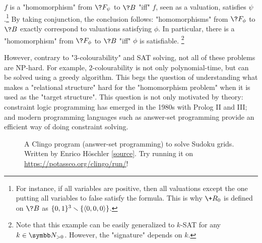 \begin{example}
	$f$ is a "homomorphism" from $\?F_\psi$ to $\?B$ "iff"
	$f$, seen as a valuation, satisfies $\psi$.\footnote{For instance,
	if all variables are positive, then all valuations except the one putting
	all variables to false satisfy the formula. This is why $\+R_0$ is defined
	on $\?B$ as $\{0,1\}^3\smallsetminus \{\langle0,0,0\rangle\}$.}
	By taking conjunction, the conclusion follows: "homomorphisms" from
	$\?F_\phi$ to $\?B$ exactly correspond to valuations satisfying $\phi$.
	In particular, there is a "homomorphism" from $\?F_\phi$ to $\?B$ "iff"
	$\phi$ is satisfiable.%
	\footnote{Note that this example can be easily generalized to $k$-SAT for any $k\in\Np$.
	However, the "signature" depends on $k$.}
\end{example}

However, contrary to "$3$-colourability" and SAT solving, not all of these problems are NP-hard. For example, $2$-colourability is not only polynomial-time,
but can be solved using a greedy algorithm. This begs the question of understanding what
makes a "relational structure" hard for the "homomorphism problem" when it is used
as the "target structure".
This question is not only motivated by theory: constraint logic programming has emerged in the 1980s
with Prolog II and III; and modern programming languages such as answer-set programming provide an 
efficient way of doing constraint solving.

\begin{figure}
	\centering
	
	\caption{
		\AP\label{fig:ex-sudoku-asp}
		A Clingo program (answer-set programming) to solve Sudoku grids.
		Written by Enrico Höschler
		\href{https://ddmler.github.io/asp/2018/07/10/answer-set-programming-sudoku-solver.html}{[source]}.
		Try running it on \url{https://potassco.org/clingo/run/}!
	}
\end{figure}


